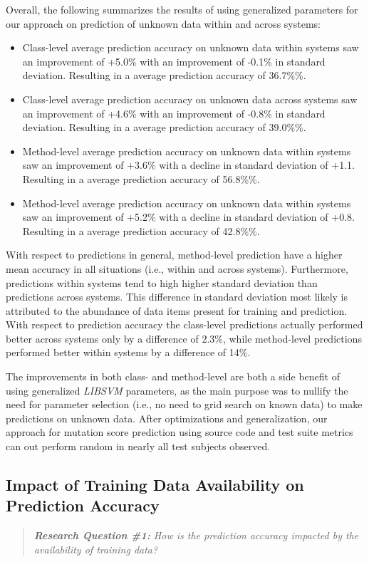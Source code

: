 Overall, the following summarizes the results of using generalized parameters for our approach on prediction of unknown data within and across systems:
\begin{itemize}
  \item Class-level average prediction accuracy on unknown data within systems saw an improvement of +5.0\% with an improvement of -0.1\% in standard deviation. Resulting in a average prediction accuracy of 36.7\%\%.
  \item Class-level average prediction accuracy on unknown data across systems saw an improvement of +4.6\% with an improvement of -0.8\% in standard deviation. Resulting in a average prediction accuracy of 39.0\%\%.
  \item Method-level average prediction accuracy on unknown data within systems saw an improvement of +3.6\% with a decline in standard deviation of +1.1. Resulting in a average prediction accuracy of 56.8\%\%.
  \item Method-level average prediction accuracy on unknown data within systems saw an improvement of +5.2\% with a decline in standard deviation of +0.8. Resulting in a average prediction accuracy of 42.8\%\%.
\end{itemize}
With respect to predictions in general, method-level prediction have a higher mean accuracy in all situations (i.e., within and across systems). Furthermore, predictions within systems tend to high higher standard deviation than predictions across systems. This difference in standard deviation most likely is attributed to the abundance of data items present for training and prediction. With respect to prediction accuracy the class-level predictions actually performed better across systems only by a difference of 2.3\%, while method-level predictions performed better within systems by a difference of 14\%.

The improvements in both class- and method-level are both a side benefit of using generalized \emph{LIBSVM} parameters, as the main purpose was to nullify the need for parameter selection (i.e., no need to grid search on known data) to make predictions on unknown data. After optimizations and generalization, our approach for mutation score prediction using source code and test suite metrics can out perform random in nearly all test subjects observed. 

\subsection{Impact of Training Data Availability on Prediction Accuracy}
\label{subsec:experiment_data}
\begin{quote}
  \emph{\textbf{Research Question \#1:} How is the prediction accuracy impacted by the availability of training data?}
\end{quote}

